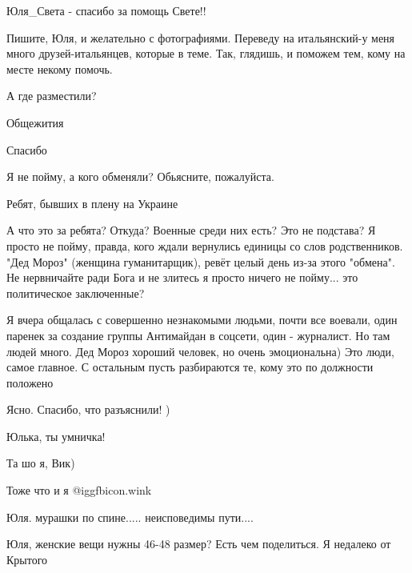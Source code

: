 \begin{itemize}
\begin{itemize}
Юля\_Света - спасибо за помощь Свете!!
\end{itemize} %


Пишите, Юля, и желательно с фотографиями. Переведу на итальянский-у меня много
друзей-итальянцев, которые в теме. Так, глядишь, и поможем тем, кому на месте некому
помочь.

А где разместили?

\begin{itemize} %
Общежития

Спасибо
\end{itemize} %

Я не пойму, а кого обменяли? Обьясните, пожалуйста.

\begin{itemize} %
Ребят, бывших в плену на Украине


А что это за ребята? Откуда? Военные среди них есть? Это не подстава? Я просто
не пойму, правда, кого ждали вернулись единицы со слов родственников. "Дед
Мороз" (женщина гуманитарщик), ревёт целый день из-за этого "обмена". Не
нервничайте ради Бога и не злитесь я просто ничего не пойму... это политическое
заключенные?



Я вчера общалась с совершенно незнакомыми людьми, почти все воевали, один
паренек за создание группы Антимайдан в соцсети, один - журналист. Но там людей
много. Дед Мороз хороший человек, но очень эмоциональна) Это люди, самое
главное. С остальным пусть разбираются те, кому это по должности положено

Ясно. Спасибо, что разъяснили! )
\end{itemize} %

Юлька, ты умничка!

\begin{itemize} %
Та шо я, Вик)

Тоже что и я  @igg{fbicon.wink} 
\end{itemize} %

Юля. мурашки по спине..... неисповедимы пути....

Юля, женские вещи нужны 46-48 размер? Есть чем поделиться. Я недалеко от Крытого


\end{itemize}
